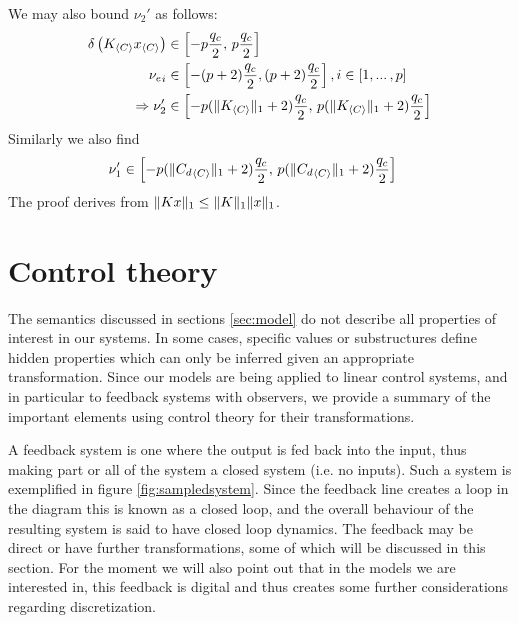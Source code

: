 \documentclass[sigconf]{llncs}
\DeclarePairedDelimiter\norm{\lVert}{\rVert}
\newcommand{\mat}[1]{{#1}}
\renewcommand{\vec}[1]{{#1}}
\begin{document}
We may also bound $\nu_2'$ as follows:
\begin{align*}
\delta\left(\mat{K}_{\langle C\rangle} \vec{x}_{\langle C\rangle} \right) &\in \left[ -p \frac{q_c}{2},\, p \frac{q_c}{2}\right]\\
{\vec{\nu_e}}_i &\in \left[ -(p+2) \frac{q_c}{2}, (p+2) \frac{q_c}{2}\right], i \in [1, ...\,,p]\\
\Rightarrow \nu_2' &\in \left[  -p(\norm{\mat{K}_{\langle C \rangle}}_1+2) \frac{q_c}{2},\, p(\norm{\mat{K}_{\langle C \rangle}}_1+2) \frac{q_c}{2}\right]
\end{align*}
Similarly we also find
\begin{align*}
\nu_1' &\in \left[  -p(\norm{{\mat{C}_d}_{\langle C \rangle}}_1+2) \frac{q_c}{2},\, p(\norm{{\mat{C}_d}_{\langle C \rangle}}_1+2) \frac{q_c}{2}\right]
\end{align*}
The proof derives from $\norm{\mat{K}\vec{x}}_1 \leq \norm{\mat{K}}_1\norm{\vec{x}}_1$.

\section{Control theory} \label{sec:control_theory}

The semantics discussed in sections \ref{sec:model} do not describe all
properties of interest in our systems.  In some cases, specific values or
substructures define hidden properties which can only be inferred given an
appropriate transformation.  Since our models are being applied to linear
control systems, and in particular to feedback systems with observers, we
provide a summary of the important elements using control theory for their
transformations.

A feedback system is one where the output is fed back into the input, thus
making part or all of the system a closed system (i.e. no inputs).
Such a system is exemplified in figure \ref{fig:sampledsystem}.  Since the
feedback line creates a loop in the diagram this is known as a closed loop,
and the overall behaviour of the resulting system is said to have closed loop dynamics.
The feedback may be direct or have further transformations, some of which will
be discussed in this section.  For the moment we will also point out that in the
models we are interested in, this feedback is digital and thus creates some
further considerations regarding discretization.
\end{document}
